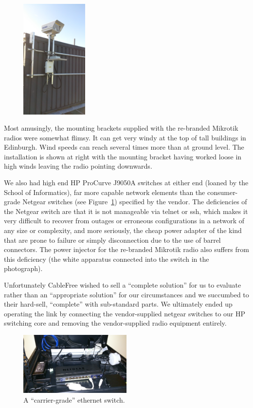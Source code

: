 \begin{figure}
  \includegraphics[angle=-90,width=0.3\textwidth]{also-faulty}
\end{figure}
Most amusingly, the mounting brackets supplied with the re-branded
Mikrotik radios were somewhat flimsy. It can get very windy at the top
of tall buildings in Edinburgh. Wind speeds can reach several times
more than at ground level. The installation is shown at right with the
mounting bracket having worked loose in high winds leaving the radio
pointing downwards.

We also had high end HP ProCurve J9050A switches at either end (loaned
by the School of Informatics), far more capable network elements than
the consumer-grade Netgear switches (see
Figure~\ref{fig:carrier-grade}) specified by the vendor. The
deficiencies of the Netgear switch are that it is not manageable via
telnet or ssh, which makes it very difficult to recover from outages
or erroneous configurations in a network of any size or complexity,
and more seriously, the cheap power adapter of the kind that are prone
to failure or simply disconnection due to the use of barrel
connectors. The power injector for the re-branded Mikrotik radio also
suffers from this deficiency (the white apparatus connected into the
switch in the photograph).

Unfortunately CableFree wished to sell a ``complete solution'' for us
to evaluate rather than an ``appropriate solution'' for our
circumstances and we succumbed to their hard-sell, ``complete'' with
sub-standard parts. We ultimately ended up operating the link by
connecting the vendor-supplied netgear switches to our HP switching
core and removing the vendor-supplied radio equipment entirely.
\begin{figure}
  \begin{center}
    \includegraphics[width=0.5\textwidth]{carrier-grade}
  \end{center}
  \caption{A ``carrier-grade'' ethernet switch.}
  \label{fig:carrier-grade}
\end{figure}

